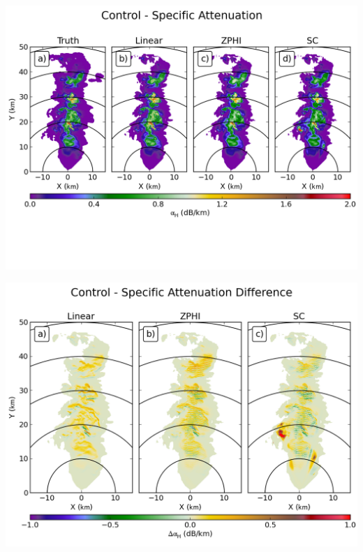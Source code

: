 \documentclass[red]{beamer}
\begin{document}
\begin{frame}
	\begin{center}
		\includegraphics[scale=0.55]{figures/C_Control_Specific_Attenuation.png}
	\end{center}
\end{frame}

\begin{frame}
	\begin{center}
		\includegraphics[scale=0.45]{figures/C_Control_Specific_Attenuation_Difference.png}
	\end{center}
\end{frame}
\end{document}
